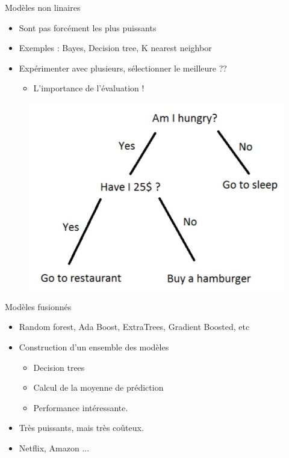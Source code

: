 \documentclass[aspectratio=169,xcolor=dvipsnames, t]{beamer}
\begin{document}
\begin{frame}{Modèles non linaires}
\begin{itemize}
	\item Sont pas forcément les plus puissants
	\item Exemples : Bayes, Decision tree, K nearest neighbor
	\item Expérimenter avec plusieurs, sélectionner le meilleure ??
	\begin{itemize}
		\item L'importance de l'évaluation !
	\end{itemize}
\end{itemize}

\begin{figure}
	\includegraphics[height=0.5\paperheight ]{figures/cm2_notLinealModels.png}
\end{figure}
\end{frame}


\begin{frame}{Modèles fusionnés}
	\begin{itemize}
		\item Random forest, Ada Boost, ExtraTrees, Gradient Boosted, etc
		\item Construction d'un ensemble des modèles 
		\begin{itemize}
			\item Decision trees
			\item Calcul de la moyenne de prédiction
			\item Performance intéressante.
		\end{itemize}
		\item Très puissants, mais très coûteux.
		\item Netflix, Amazon ... 
	\end{itemize}
\end{frame}
\end{document}
